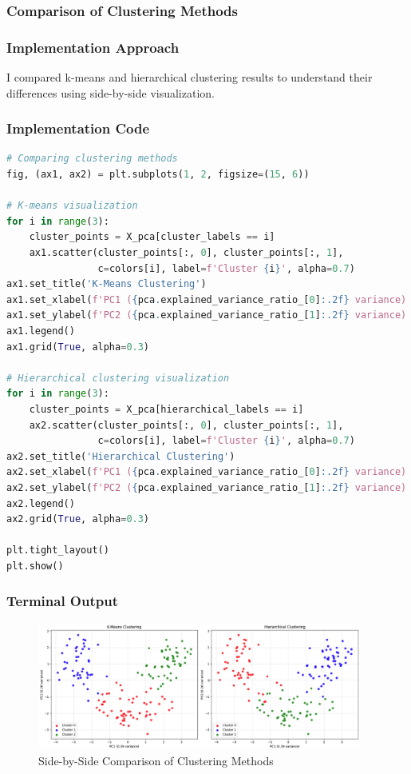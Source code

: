 \documentclass[12pt,a4paper]{article}
\begin{document}
\subsubsection{Comparison of Clustering Methods}

\subsubsection{Implementation Approach}
I compared k-means and hierarchical clustering results to understand their differences using side-by-side visualization.

\subsubsection{Implementation Code}
\begin{lstlisting}[language=Python, caption=Clustering Methods Comparison]
# Comparing clustering methods
fig, (ax1, ax2) = plt.subplots(1, 2, figsize=(15, 6))

# K-means visualization
for i in range(3):
    cluster_points = X_pca[cluster_labels == i]
    ax1.scatter(cluster_points[:, 0], cluster_points[:, 1], 
                c=colors[i], label=f'Cluster {i}', alpha=0.7)
ax1.set_title('K-Means Clustering')
ax1.set_xlabel(f'PC1 ({pca.explained_variance_ratio_[0]:.2f} variance)')
ax1.set_ylabel(f'PC2 ({pca.explained_variance_ratio_[1]:.2f} variance)')
ax1.legend()
ax1.grid(True, alpha=0.3)

# Hierarchical clustering visualization
for i in range(3):
    cluster_points = X_pca[hierarchical_labels == i]
    ax2.scatter(cluster_points[:, 0], cluster_points[:, 1], 
                c=colors[i], label=f'Cluster {i}', alpha=0.7)
ax2.set_title('Hierarchical Clustering')
ax2.set_xlabel(f'PC1 ({pca.explained_variance_ratio_[0]:.2f} variance)')
ax2.set_ylabel(f'PC2 ({pca.explained_variance_ratio_[1]:.2f} variance)')
ax2.legend()
ax2.grid(True, alpha=0.3)

plt.tight_layout()
plt.show()
\end{lstlisting}

\subsubsection{Terminal Output}
\begin{figure}[h!]
\centering
    \includegraphics[width=0.95\textwidth]{Figures/clustering_comparison.png}
    \caption{Side-by-Side Comparison of Clustering Methods}
\end{figure}
\end{document}
